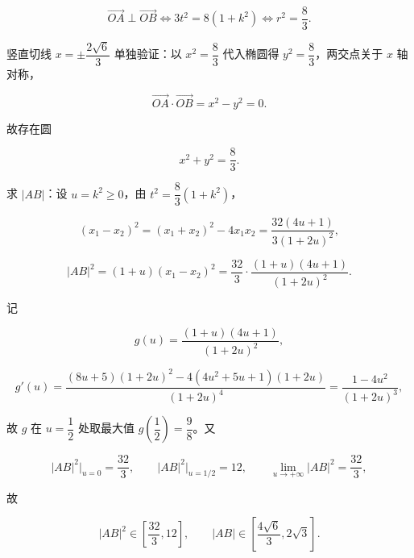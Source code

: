 \begin{answer}
\nopagebreak[4]
\[\overrightarrow{OA}\perp\overrightarrow{OB}\iff 3t^2=8(1+k^2)\iff r^2=\frac83 .\]

竖直切线 $x=\pm\dfrac{2\sqrt6}{3}$ 单独验证：以 $x^2=\dfrac83$ 代入椭圆得 $y^2=\dfrac83$，两交点关于 $x$ 轴对称，

\nopagebreak[4]
\[\overrightarrow{OA}\cdot\overrightarrow{OB}=x^2-y^2=0 .\]

故存在圆

\nopagebreak[4]
\[x^2+y^2=\frac83 .\]

求 $|AB|$：设 $u=k^2\geqslant0$，由 $t^2=\dfrac83(1+k^2)$，

\nopagebreak[4]
\[(x_1-x_2)^2=(x_1+x_2)^2-4x_1x_2
=\frac{32(4u+1)}{3(1+2u)^2},\]

\nopagebreak[4]
\[|AB|^2=(1+u)(x_1-x_2)^2=\frac{32}{3}\cdot\frac{(1+u)(4u+1)}{(1+2u)^2}.\]

记

\nopagebreak[4]
\[g(u)=\frac{(1+u)(4u+1)}{(1+2u)^2},\]

\nopagebreak[4]
\[g'(u)=\frac{(8u+5)(1+2u)^2-4(4u^2+5u+1)(1+2u)}{(1+2u)^4}
=\frac{1-4u^2}{(1+2u)^3},\]

故 $g$ 在 $u=\dfrac12$ 处取最大值 $g\left(\dfrac12\right)=\dfrac98$。又

\nopagebreak[4]
\[|AB|^2\Big|_{u=0}=\frac{32}{3},\qquad |AB|^2\Big|_{u=1/2}=12,\qquad \lim_{u\to+\infty}|AB|^2=\frac{32}{3},\]

故

\nopagebreak[4]
\[|AB|^2\in\left[\frac{32}{3},12\right],\qquad |AB|\in\left[\frac{4\sqrt6}{3},2\sqrt3\right].\]


\end{answer}